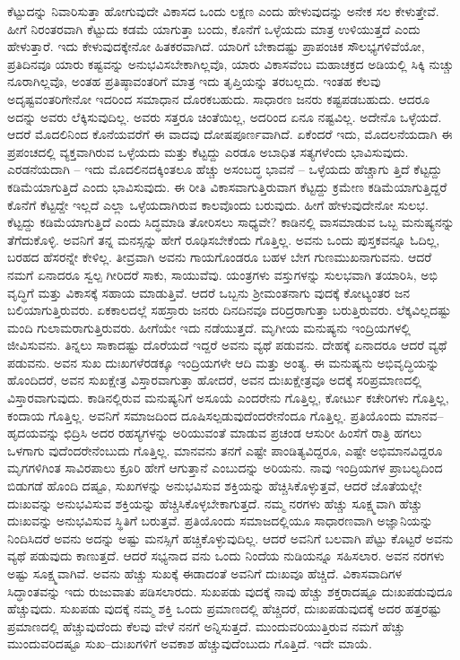 ಕೆಟ್ಟುದನ್ನು ನಿವಾರಿಸುತ್ತಾ ಹೋಗುವುದೇ ವಿಕಾಸದ ಒಂದು ಲಕ್ಷಣ ಎಂದು ಹೇಳುವುದನ್ನು ಅನೇಕ ಸಲ ಕೇಳುತ್ತೇವೆ. ಹೀಗೆ ನಿರಂತರವಾಗಿ ಕೆಟ್ಟುದು ಕಡಮೆ ಯಾಗುತ್ತಾ ಬಂದು, ಕೊನೆಗೆ ಒಳ್ಳೆಯದು ಮಾತ್ರ ಉಳಿಯುತ್ತದೆ ಎಂದು ಹೇಳುತ್ತಾರೆ. ಇದು ಕೇಳುವುದಕ್ಕೇನೋ ಹಿತಕರವಾಗಿದೆ. ಯಾರಿಗೆ ಬೇಕಾದಷ್ಟು ಪ್ರಾಪಂಚಿಕ ಸೌಲಭ್ಯಗಳಿವೆಯೋ, ಪ್ರತಿದಿನವೂ ಯಾರು ಕಷ್ಟವನ್ನು ಅನುಭವಿಸಬೇಕಾಗಿಲ್ಲವೊ, ಯಾರು ವಿಕಾಸವೆಂಬ ಮಹಾಚಕ್ರದ ಅಡಿಯಲ್ಲಿ ಸಿಕ್ಕಿ ನುಚ್ಚು ನೂರಾಗಿಲ್ಲವೊ, ಅಂತಹ ಪ್ರತಿಷ್ಠಾವಂತರಿಗೆ ಮಾತ್ರ ಇದು ತೃಪ್ತಿಯನ್ನು ತರಬಲ್ಲದು. ಇಂತಹ ಕೆಲವು ಅದೃಷ್ಟವಂತರಿಗೇನೋ ಇದರಿಂದ ಸಮಾಧಾನ ದೊರಕಬಹುದು. ಸಾಧಾರಣ ಜನರು ಕಷ್ಟಪಡಬಹುದು. ಆದರೂ ಅದನ್ನು ಅವರು ಲೆಕ್ಕಿಸುವುದಿಲ್ಲ. ಅವರು ಸತ್ತರೂ ಚಿಂತೆಯಿಲ್ಲ, ಅದರಿಂದ ಏನೂ ನಷ್ಟವಿಲ್ಲ. ಅದೇನೊ ಒಳ್ಳೆಯದೆ. ಆದರೆ ಮೊದಲಿನಿಂದ ಕೊನೆಯವರೆಗೆ ಈ ವಾದವು ದೋಷಪೂರ್ಣವಾಗಿದೆ. ಏಕೆಂದರೆ ಇದು, ಮೊದಲನೆಯದಾಗಿ ಈ ಪ್ರಪಂಚದಲ್ಲಿ ವ್ಯಕ್ತವಾಗಿರುವ ಒಳ್ಳೆಯದು ಮತ್ತು ಕೆಟ್ಟದ್ದು ಎರಡೂ ಅಬಾಧಿತ ಸತ್ಯಗಳೆಂದು ಭಾವಿಸುವುದು. ಎರಡನೆಯದಾಗಿ – ಇದು ಮೊದಲಿನದಕ್ಕಿಂತಲೂ ಹೆಚ್ಚು ಅಸಂಬದ್ಧ ಭಾವನೆ – ಒಳ್ಳೆಯದು ಹೆಚ್ಚಾಗು ತ್ತಿದೆ ಕೆಟ್ಟದ್ದು ಕಡಿಮೆಯಾಗುತ್ತಿದೆ ಎಂದು ಭಾವಿಸುವುದು. ಈ ರೀತಿ ವಿಕಾಸವಾಗುತ್ತಿರುವಾಗ ಕೆಟ್ಟದ್ದು ಕ್ರಮೇಣ ಕಡಿಮೆಯಾಗುತ್ತಿದ್ದರೆ ಕೊನೆಗೆ ಕೆಟ್ಟದ್ದೇ ಇಲ್ಲದೆ ಎಲ್ಲಾ ಒಳ್ಳೆಯದಾಗಿರುವ ಕಾಲವೊಂದು ಬರುವುದು. ಹೀಗೆ ಹೇಳುವುದೇನೋ ಸುಲಭ. ಕೆಟ್ಟದ್ದು ಕಡಿಮೆಯಾಗುತ್ತಿದೆ ಎಂದು ಸಿದ್ಧಮಾಡಿ ತೋರಿಸಲು ಸಾಧ್ಯವೇ? ಕಾಡಿನಲ್ಲಿ ವಾಸಮಾಡುವ ಒಬ್ಬ ಮನುಷ್ಯನನ್ನು ತೆಗೆದುಕೊಳ್ಳಿ. ಅವನಿಗೆ ತನ್ನ ಮನಸ್ಸನ್ನು ಹೇಗೆ ರೂಢಿಸಬೇಕೆಂದು ಗೊತ್ತಿಲ್ಲ. ಅವನು ಒಂದು ಪುಸ್ತಕವನ್ನೂ ಓದಿಲ್ಲ, ಬರಹದ ಹೆಸರನ್ನೇ ಕೇಳಿಲ್ಲ. ತೀವ್ರವಾಗಿ ಅವನು ಗಾಯಗೊಂಡರೂ ಬಹಳ ಬೇಗ ಗುಣಮುಖನಾಗುವನು. ಆದರೆ ನಮಗೆ ಏನಾದರೂ ಸ್ವಲ್ಪ ಗೀರಿದರೆ ಸಾಕು, ಸಾಯುವೆವು. ಯಂತ್ರಗಳು ವಸ್ತುಗಳನ್ನು ಸುಲಭವಾಗಿ ತಯಾರಿಸಿ, ಅಭಿ ವೃದ್ಧಿಗೆ ಮತ್ತು ವಿಕಾಸಕ್ಕೆ ಸಹಾಯ ಮಾಡುತ್ತಿವೆ. ಆದರೆ ಒಬ್ಬನು ಶ‍್ರೀಮಂತನಾಗು ವುದಕ್ಕೆ ಕೋಟ್ಯಂತರ ಜನ ಬಲಿಯಾಗುತ್ತಿರುವರು. ಏಕಕಾಲದಲ್ಲೆ ಸಹಸ್ರಾರು ಜನರು ದಿನದಿನವೂ ದರಿದ್ರರಾಗುತ್ತಾ ಬರುತ್ತಿರುವರು. ಲೆಕ್ಕವಿಲ್ಲದಷ್ಟು ಮಂದಿ ಗುಲಾಮರಾಗುತ್ತಿರುವರು. ಹೀಗೆಯೇ ಇದು ನಡೆಯುತ್ತದೆ. ಮೃಗೀಯ ಮನುಷ್ಯನು ಇಂದ್ರಿಯಗಳಲ್ಲಿ ಜೀವಿಸುವನು. ತಿನ್ನಲು ಸಾಕಾದಷ್ಟು ದೊರೆಯದೆ ಇದ್ದರೆ ಅವನು ವ್ಯಥೆ ಪಡುವನು. ದೇಹಕ್ಕೆ ಏನಾದರೂ ಆದರೆ ವ್ಯಥೆ ಪಡುವನು. ಅವನ ಸುಖ ದುಃಖಗಳೆರಡಕ್ಕೂ ಇಂದ್ರಿಯಗಳೇ ಆದಿ ಮತ್ತು ಅಂತ್ಯ. ಈ ಮನುಷ್ಯನು ಅಭಿವೃದ್ಧಿಯನ್ನು ಹೊಂದಿದರೆ, ಅವನ ಸುಖಕ್ಷೇತ್ರ ವಿಸ್ತಾರವಾಗುತ್ತಾ ಹೋದರೆ, ಅವನ ದುಃಖಕ್ಷೇತ್ರವೂ ಅದಕ್ಕೆ ಸರಿಪ್ರಮಾಣದಲ್ಲಿ ವಿಸ್ತಾರವಾಗುವುದು. ಕಾಡಿನಲ್ಲಿರುವ ಮನುಷ್ಯನಿಗೆ ಅಸೂಯೆ ಎಂದರೇನು ಗೊತ್ತಿಲ್ಲ, ಕೋರ್ಟು ಕಚೇರಿಗಳು ಗೊತ್ತಿಲ್ಲ, ಕಂದಾಯ ಗೊತ್ತಿಲ್ಲ. ಅವನಿಗೆ ಸಮಾಜದಿಂದ ದೂಷಿಸಲ್ಪಡುವುದೆಂದರೇನೆಂದೂ ಗೊತ್ತಿಲ್ಲ. ಪ್ರತಿಯೊಂದು ಮಾನವ–ಹೃದಯವನ್ನು ಛಿದ್ರಿಸಿ ಅದರ ರಹಸ್ಯಗಳನ್ನು ಅರಿಯುವಂತೆ ಮಾಡುವ ಪ್ರಚಂಡ ಆಸುರೀ ಹಿಂಸೆಗೆ ರಾತ್ರಿ ಹಗಲು ಒಳಗಾಗು ವುದೆಂದರೇನೆಂಬುದು ಗೊತ್ತಿಲ್ಲ. ಮಾನವನು ತನಗೆ ಎಷ್ಟೇ ಪಾಂಡಿತ್ಯವಿದ್ದರೂ, ಎಷ್ಟೇ ಅಭಿಮಾನವಿದ್ದರೂ ಮೃಗಗಳಿಗಿಂತ ಸಾವಿರಪಾಲು ಕ್ರೂರಿ ಹೇಗೆ ಆಗುತ್ತಾನೆ ಎಂಬುದನ್ನು ಅರಿಯನು. ನಾವು ಇಂದ್ರಿಯಗಳ ಪ್ರಾಬಲ್ಯದಿಂದ ಬಿಡುಗಡೆ ಹೊಂದಿ ದಷ್ಟೂ, ಸುಖಗಳನ್ನು ಅನುಭವಿಸುವ ಶಕ್ತಿಯನ್ನು ಹೆಚ್ಚಿಸಿಕೊಳ್ಳುತ್ತವೆ, ಆದರೆ ಜೊತೆಯಲ್ಲೇ ದುಃಖವನ್ನು ಅನುಭವಿಸುವ ಶಕ್ತಿಯನ್ನು ಹೆಚ್ಚಿಸಿಕೊಳ್ಳಬೇಕಾಗುತ್ತದೆ. ನಮ್ಮ ನರಗಳು ಹೆಚ್ಚು ಸೂಕ್ಷ್ಮವಾಗಿ ಹೆಚ್ಚು ದುಃಖವನ್ನು ಅನುಭವಿಸುವ ಸ್ಥಿತಿಗೆ ಬರುತ್ತವೆ. ಪ್ರತಿಯೊಂದು ಸಮಾಜದಲ್ಲಿಯೂ ಸಾಧಾರಣವಾಗಿ ಅಜ್ಞಾನಿಯನ್ನು ನಿಂದಿಸಿದರೆ ಅವನು ಅದನ್ನು ಅಷ್ಟು ಮನಸ್ಸಿಗೆ ಹಚ್ಚಿಕೊಳ್ಳುವುದಿಲ್ಲ. ಆದರೆ ಅವನಿಗೆ ಬಲವಾಗಿ ಪೆಟ್ಟು ಕೊಟ್ಟರೆ ಅವನು ವ್ಯಥೆ ಪಡುವುದು ಕಾಣುತ್ತದೆ. ಆದರೆ ಸಭ್ಯನಾದ ವನು ಒಂದು ನಿಂದೆಯ ನುಡಿಯನ್ನೂ ಸಹಿಸಲಾರ. ಅವನ ನರಗಳು ಅಷ್ಟು ಸೂಕ್ಷ್ಮವಾಗಿವೆ. ಅವನು ಹೆಚ್ಚು ಸುಖಕ್ಕೆ ಈಡಾದಂತೆ ಅವನಿಗೆ ದುಃಖವೂ ಹೆಚ್ಚಿದೆ. ವಿಕಾಸವಾದಿಗಳ ಸಿದ್ಧಾಂತವನ್ನು ಇದು ರುಜುವಾತು ಪಡಿಸಲಾರದು. ಸುಖಪಡು ವುದಕ್ಕೆ ನಾವು ಹೆಚ್ಚು ಶಕ್ತರಾದಷ್ಟೂ ದುಃಖಪಡುವುದೂ ಹೆಚ್ಚುವುದು. ಸುಖಪಡು ವುದಕ್ಕೆ ನಮ್ಮ ಶಕ್ತಿ ಒಂದು ಪ್ರಮಾಣದಲ್ಲಿ ಹೆಚ್ಚಿದರೆ, ದುಃಖಪಡುವುದಕ್ಕೆ ಅದರ ಹತ್ತರಷ್ಟು ಪ್ರಮಾಣದಲ್ಲಿ ಹೆಚ್ಚುವುದೆಂದು ಕೆಲವು ವೇಳೆ ನನಗೆ ಅನ್ನಿಸುತ್ತದೆ. ಮುಂದುವರಿಯುತ್ತಿರುವ ನಮಗೆ ಹೆಚ್ಚು ಮುಂದುವರಿದಷ್ಟೂ ಸುಖ–ದುಃಖಗಳಿಗೆ ಅವಕಾಶ ಹೆಚ್ಚುವುದೆಂಬುದು ಗೊತ್ತಿದೆ. ಇದೇ ಮಾಯೆ.

